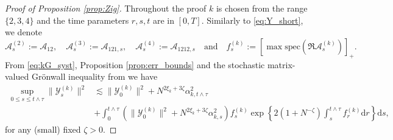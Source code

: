 \documentclass[10pt]{amsart}
\numberwithin{equation}{section}
\newcommand{\dif}{\mathrm{d}}
\begin{document}
\begin{proof}[Proof of Proposition \ref{prop:Zig}] Throughout the proof $k$ is chosen from the range $\{2,3,4\}$ and the time parameters $r,s,t$ are in $[0,T]$. Similarly to \eqref{eq:Y_short}, we denote
\begin{equation*}
\mathcal{A}^{(2)}_s:=\mathcal{A}_{12},\quad \mathcal{A}^{(3)}_{s}:=\mathcal{A}_{121,s},\quad \mathcal{A}^{(4)}_s:=\mathcal{A}_{1212,s} \quad\text{and}\quad f_{s}^{(k)}:=\left[\max\mathrm{spec}\left(\Re \mathcal{A}^{(k)}_s\right)\right]_+.
\end{equation*}
From \eqref{eq:kG_syst}, Proposition \ref{prop:err_bounds} and the stochastic matrix-valued Gr{\"o}nwall inequality from \cite[Lemma 5.6]{univ_extr} we have
\begin{equation}
\begin{split}
\sup_{0\le s\le t\wedge \tau} \|\mathcal{Y}^{(k)}_s\|^2 &\lesssim \|\mathcal{Y}_0^{(k)}\|^2 + N^{2\xi_k+3\zeta}\alpha_{k,t\wedge \tau}^2\\
& + \int_0^{t\wedge \tau} \left(\lVert \mathcal{Y}_0^{(k)}\rVert^2 +N^{2\xi_k+3\zeta}\alpha_{k,s}^2\right)f_{s}^{(k)} \exp\left\lbrace 2(1+N^{-\zeta})\int_s^{t\wedge\tau} f_{r}^{(k)}\dif r\right\rbrace \dif s, 
\end{split}
\label{eq:stoch_Gronwall}
\end{equation}
for any (small) fixed $\zeta>0$.





\end{proof}
\end{document}
